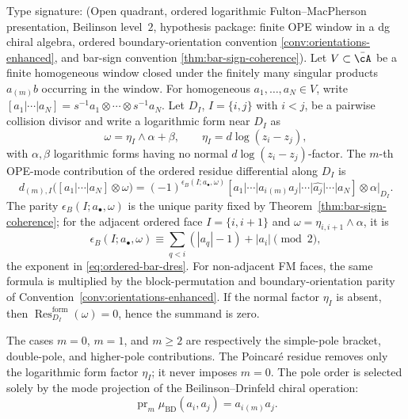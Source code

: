 \begin{theorem}\label{thm:residue-formula}
Type signature: \textup{(}Open quadrant, ordered logarithmic
Fulton--MacPherson presentation, Beilinson level~$2$, hypothesis
package: finite OPE window in a dg chiral algebra, ordered
boundary-orientation convention
\ref{conv:orientations-enhanced}, and bar-sign convention
\ref{thm:bar-sign-coherence}\textup{)}.
Let \(V\subset\bar\cA\) be a finite homogeneous window closed under
the finitely many singular products \(a_{(m)}b\) occurring in the
window. For homogeneous \(a_1,\ldots,a_N\in V\), write
\([a_1|\cdots|a_N]=s^{-1}a_1\otimes\cdots\otimes s^{-1}a_N\).
Let \(D_I\), \(I=\{i,j\}\) with \(i<j\), be a pairwise collision
divisor and write
a logarithmic form near \(D_I\) as
\[
\omega=\eta_I\wedge\alpha+\beta,\qquad
\eta_I=d\log(z_i-z_j),
\]
with \(\alpha,\beta\) logarithmic forms having no normal
\(d\log(z_i-z_j)\)-factor. The \(m\)-th OPE-mode contribution of the
ordered residue differential along \(D_I\) is
\begin{equation}\label{eq:ordered-residue-arbitrary-mode}
d_{(m),I}\bigl([a_1|\cdots|a_N]\otimes\omega\bigr)
=
(-1)^{\epsilon_B(I;a_\bullet,\omega)}
[a_1|\cdots|a_i{}_{(m)}a_j|\cdots|
\widehat{a_j}|\cdots|a_N]\otimes\alpha|_{D_I}.
\end{equation}
The parity \(\epsilon_B(I;a_\bullet,\omega)\) is the unique parity
fixed by Theorem~\ref{thm:bar-sign-coherence}; for the adjacent
ordered face \(I=\{i,i+1\}\) and \(\omega=\eta_{i,i+1}\wedge\alpha\),
it is
\[
\epsilon_B(I;a_\bullet,\omega)
\equiv
\sum_{q<i}(|a_q|-1)+|a_i|
\pmod 2,
\]
the exponent in \eqref{eq:ordered-bar-dres}. For non-adjacent FM
faces, the same formula is multiplied by the block-permutation and
boundary-orientation parity of
Convention~\ref{conv:orientations-enhanced}.
If the normal factor \(\eta_I\) is absent, then
\(\operatorname{Res}^{\mathrm{form}}_{D_I}(\omega)=0\), hence the
summand is zero.

The cases \(m=0\), \(m=1\), and \(m\ge2\) are respectively the
simple-pole bracket, double-pole, and higher-pole contributions. The
Poincar\'e residue removes only the logarithmic form factor
\(\eta_I\); it never imposes \(m=0\). The pole order is selected
solely by the mode projection of the Beilinson--Drinfeld chiral
operation:
\[
\operatorname{pr}_m\mu_{\mathrm{BD}}(a_i,a_j)
=a_i{}_{(m)}a_j .
\]
\end{theorem}

